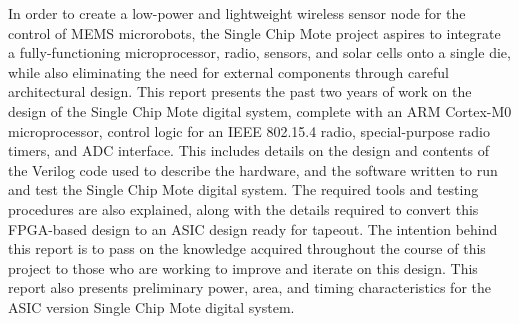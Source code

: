 In order to create a low-power and lightweight wireless sensor node for the control of MEMS microrobots, the Single Chip Mote project aspires to integrate a fully-functioning microprocessor, radio, sensors, and solar cells onto a single die, while also eliminating the need for external components through careful architectural design. This report presents the past two years of work on the design of the Single Chip Mote digital system, complete with an ARM Cortex-M0 microprocessor, control logic for an IEEE 802.15.4 radio, special-purpose radio timers, and ADC interface. This includes details on the design and contents of the Verilog code used to describe the hardware, and the software written to run and test the Single Chip Mote digital system. The required tools and testing procedures are also explained, along with the details required to convert this FPGA-based design to an ASIC design ready for tapeout. The intention behind this report is to pass on the knowledge acquired throughout the course of this project to those who are working to improve and iterate on this design. This report also presents preliminary power, area, and timing characteristics for the ASIC version Single Chip Mote digital system.